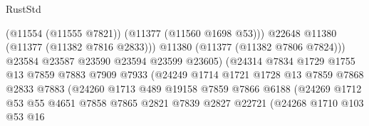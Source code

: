 \begin{lexlean}{RustStd}
\begin{coremodule}
                                            (@11554 (@11555 @7821))
                                            (@11377 (@11560 @1698 @53)))
                                          @22648
                                          @11380
                                          (@11377 (@11382 @7816 @2833)))
                                        @11380
                                        (@11377 (@11382 @7806 @7824)))
                                      @23584
                                      @23587
                                      @23590
                                      @23594
                                      @23599
                                      @23605)
                                    (@24314
                                      @7834
                                      @1729
                                      @1755
                                      @13
                                      @7859
                                      @7883
                                      @7909
                                      @7933
                                      (@24249
                                        @1714
                                        @1721
                                        @1728
                                        @13
                                        @7859
                                        @7868
                                        @2833
                                        @7883
                                        (@24260
                                          @1713
                                          @489
                                          @19158
                                          @7859
                                          @7866
                                          @6188
                                          (@24269
                                            @1712
                                            @53
                                            @55
                                            @4651
                                            @7858
                                            @7865
                                            @2821
                                            @7839
                                            @2827
                                            @22721
                                            (@24268
                                              @1710
                                              @103
                                              @53
                                              @16

\end{coremodule}
\end{lexlean}

